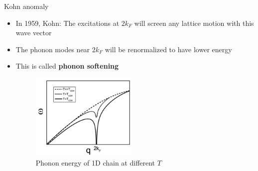 \documentclass{beamer}
\begin{document}
\begin{frame}{Kohn anomaly}
\begin{itemize}
\item In 1959, Kohn: The excitations at $2 k_F$ will screen any lattice motion with this wave vector
\item The phonon modes near $2 k_F$ will be renormalized to have lower energy
\item This is called \textbf{phonon softening}
\begin{figure}
\includegraphics[width=2in]{figs/kohn_anomaly.png}
\caption{\label{fig:kohn_anomaly} Phonon energy of 1D chain at different $T$}
\end{figure}
\end{itemize}
\end{frame}


\end{document}

